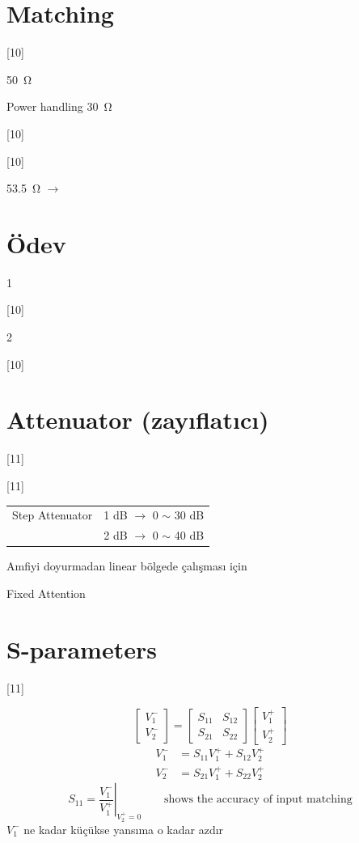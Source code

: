 \documentclass[11pt,a4paper]{article}
\begin{document}
\section{Matching}
[10]

\qty{50}{\ohm}

Power handling \quad \qty{30}{\ohm}

[10]

[10]

\qty{53,5}{\ohm} $\rightarrow$ 

\section{Ödev}
\textcircled{1}

[10]

\textcircled{2}

[10]

\section{Attenuator (zayıflatıcı)}
[11]

[11]

\begin{tabular}{@{}l@{\qquad}l@{}}
Step Attenuator & 1 dB $\rightarrow$ 0 $\sim$ 30 dB\\
 & 2 dB $\rightarrow$ 0 $\sim$ 40 dB
\end{tabular}

Amfiyi doyurmadan linear bölgede çalışması için

Fixed Attention

\section{S-parameters}
[11]

\[ \begin{bmatrix} V_1^-\\ V_2^- \end{bmatrix} = \begin{bmatrix} S_{11} & S_{12}\\ S_{21} & S_{22} \end{bmatrix} \begin{bmatrix} V_1^+\\ V_2^+ \end{bmatrix} \]
\begin{align*}
V_1^- &= S_{11}V_1^+ + S_{12}V_2^+\\
V_2^- &= S_{21}V_1^+ + S_{22}V_2^+
\end{align*}
\[ S_{11} = \left.\frac{V_1^-}{V_1^+}\right|_{V_2^+=0} \qquad \text{shows the accuracy of input matching} \]
$V_1^-$ ne kadar küçükse yansıma o kadar azdır
\end{document}
